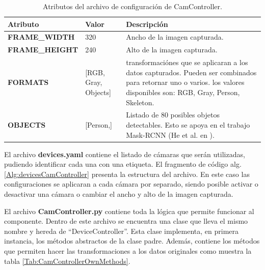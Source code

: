     \begin{table}[ht!]
    \caption[Archivo de configuración de CamController]{Atributos del archivo de configuración de CamController.}
    \label{Tab:ConfigFileCamController}
    \centering
    \begin{tabular}{ | l l p{6cm} | } 
        \hline
        \textbf{Atributo}       & \textbf{Valor} & \textbf{Descripción} \\ 
        \hline\hline
        \textbf{FRAME\_WIDTH}   & 320 & Ancho de la imagen capturada.\\
        \hline
        \textbf{FRAME\_HEIGHT}  & 240 & Alto de la imagen capturada.\\
        \hline
        \textbf{FORMATS}        & [RGB, Gray, Objects] & transformaciónes que se aplicaran a los datos capturados. Pueden ser combinados para retornar uno o varios. los valores disponibles son: RGB, Gray, Person, Skeleton.\\
        \hline
        \textbf{OBJECTS}        & [Person,] & Listado de 80 posibles objetos detectables. Esto se apoya en el trabajo Mask-RCNN (He et al. en \cite{He2017}). \\
        \hline
    \end{tabular}
    \end{table}
    
    El archivo \textbf{devices.yaml} contiene el listado de cámaras que serán utilizadas, pudiendo identificar cada una con una etiqueta. El fragmento de código alg. \ref{Alg:devicesCamController} presenta la estructura del archivo. En este caso las configuraciones se aplicaran a cada cámara por separado, siendo posible activar o desactivar una cámara o cambiar el ancho y alto de la imagen capturada.
    
    

    El archivo \textbf{CamController.py} contiene toda la lógica que permite funcionar al componente. Dentro de este archivo se encuentra una clase que lleva el mismo nombre y hereda de ``DeviceController''. Esta clase implementa, en primera instancia, los métodos abstractos de la clase padre. Además, contiene los métodos que permiten hacer las transformaciones a los datos originales como muestra la tabla \ref{Tab:CamControllerOwnMethods}.
    
